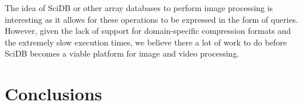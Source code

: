 \documentclass[tog]{acmsiggraph}
\begin{document}
The idea of SciDB or other array databases to perform image processing is
interesting as it allows for these operations to be expressed in the form of
queries. However, given the lack of support for domain-specific compression
formats and the extremely slow execution times, we believe there a lot of work
to do before SciDB becomes a viable platform for image and video processing.

\section{Conclusions}



\nocite{*}

\end{document}
